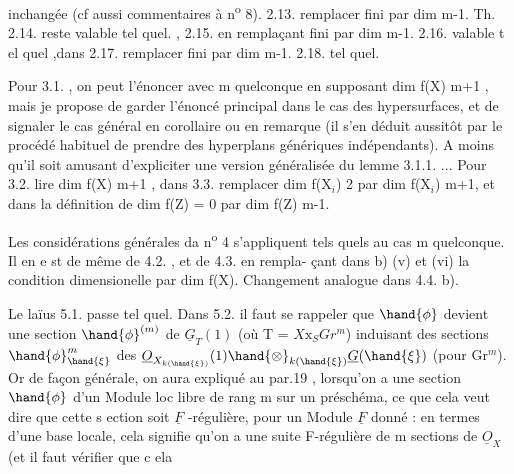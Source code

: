 
inchangée (cf aussi  commentaires à n\textsuperscript{o} 8). 2.13. remplacer fini
par dim \hand{$\leqslant$} m-1. Th. 2.14. reste valable tel quel. , 2.15. en
remplaçant fini par dim \hand{$\leqslant$} m-1. 2.16. valable t el quel ,dans
 2.17. remplacer fini par dim \hand{$\leqslant$} m-1. 2.18. tel quel.

Pour 3.1. , on peut l'énoncer avec m quelconque en supposant
dim f(X) \hand{$\geqslant$} m+1 , mais je propose de garder l'énoncé principal dans
le cas des hypersurfaces, et de signaler le cas général en corollaire
ou en remarque (il s'en déduit aussitôt par le procédé habituel de
prendre des hyperplans génériques indépendants). A moins qu'il soit
amusant d'expliciter une version généralisée du lemme 3.1.1. ...
Pour 3.2. lire dim f(X)\hand{$\geqslant$} m+1 , dans 3.3. remplacer dim f(X$_i$) \hand{$\geqslant$} 2
par dim f(X$_i$)\hand{$\geqslant$} m+1, et dans la définition de  dim f(Z) = 0
par dim f(Z) \hand{$\leqslant$} m-1.

Les considérations générales da n\textsuperscript{o} 4 s'appliquent tels quels
au cas m quelconque. Il en e st de même de 4.2. , et de 4.3. en rempla-%
çant dans b) (v) et (vi) la condition dimensionelle par
dim f(X). Changement analogue dans 4.4. b).

Le laïus 5.1. passe tel quel. Dans 5.2. il faut se rappeler
que $\hand{\phi}$ devient une section $\hand{\phi}^{(m)}$ de $\underline{G}_T(1)$ (où T 
 = $X\mathrm{x}_S Gr^m$)  induisant des sections
$\hand{\phi}^m_{\hand{\xi}}$ des   $\underline{O}_{X_{k(\hand{\xi})}}(1)\hand{\otimes}_{k(\hand{\xi})}\underline{G}(\hand{\xi})$ (pour \hand{$\xi \in$} Gr$^m$). Or
de façon générale, on aura expliqué au par.19 , lorsqu'on a une
\margin{$\|$} section $\hand{\phi}$ d'un Module loc libre de rang m sur un préschéma, ce que
ce\deleted{\ }la veut dire que cette s ection soit $\underline{F}$ -régulière, pour un Module
$\underline{F}$ donné : en termes d'une base locale, cela signifie qu'on a une
suite F-régulière de m sections de $\underline{O}_X$ (et il faut vérifier que c ela

